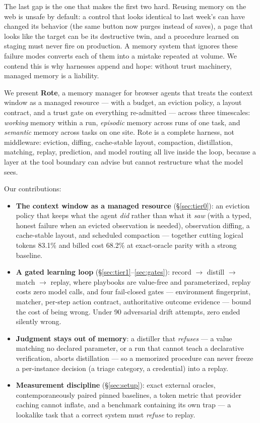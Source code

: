 \documentclass{article} %
\begin{document}
The last gap is the one that makes the first two hard. Reusing memory on the web is
unsafe by default: a control that looks identical to last week's can have changed its
behavior (the same button now purges instead of saves), a page that looks like the
target can be its destructive twin, and a procedure learned on staging must never fire
on production. A memory system that ignores these failure modes converts each of them
into a mistake repeated at volume. We contend this is why harnesses append and hope:
without trust machinery, managed memory is a liability.

We present \textbf{Rote}, a memory manager for browser agents that treats the context
window as a managed resource --- with a budget, an eviction policy, a layout contract,
and a trust gate on everything re-admitted --- across three timescales: \emph{working}
memory within a run, \emph{episodic} memory across runs of one task, and
\emph{semantic} memory across tasks on one site. Rote is a complete harness, not
middleware: eviction, diffing, cache-stable layout, compaction, distillation, matching,
replay, prediction, and model routing all live inside the loop, because a layer at the
tool boundary can advise but cannot restructure what the model sees.

Our contributions:
\begin{itemize}
\item \textbf{The context window as a managed resource} (\S\ref{sec:tier0}): an
  eviction policy that keeps what the agent \emph{did} rather than what it \emph{saw}
  (with a typed, honest failure when an evicted observation is needed), observation
  diffing, a cache-stable layout, and scheduled compaction --- together cutting logical
  tokens 83.1\% and billed cost 68.2\% at exact-oracle parity with a strong baseline.
\item \textbf{A gated learning loop} (\S\ref{sec:tier1}--\ref{sec:gates}): record
  $\rightarrow$ distill $\rightarrow$ match $\rightarrow$ replay, where playbooks are
  value-free and parameterized, replay costs zero model calls, and four fail-closed
  gates --- environment fingerprint, matcher, per-step action contract, authoritative
  outcome evidence --- bound the cost of being wrong. Under 90 adversarial drift
  attempts, zero ended silently wrong.
\item \textbf{Judgment stays out of memory}: a distiller that \emph{refuses} --- a
  value matching no declared parameter, or a run that cannot teach a declarative
  verification, aborts distillation --- so a memorized procedure can never freeze a
  per-instance decision (a triage category, a credential) into a replay.
\item \textbf{Measurement discipline} (\S\ref{sec:setup}): exact external oracles,
  contemporaneously paired pinned baselines, a token metric that provider caching
  cannot inflate, and a benchmark containing its own trap --- a lookalike task that a
  correct system must \emph{refuse} to replay.
\end{itemize}
\end{document}
